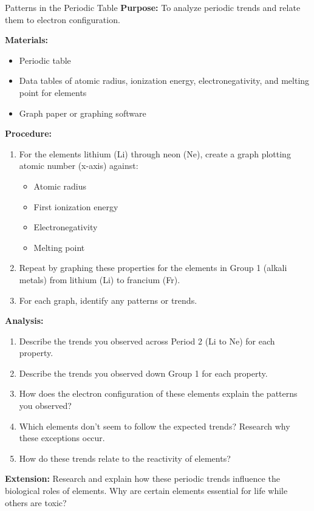 
\begin{investigation}{Patterns in the Periodic Table}
\textbf{Purpose:} To analyze periodic trends and relate them to electron configuration.

\textbf{Materials:}
\begin{itemize}
    \item Periodic table
    \item Data tables of atomic radius, ionization energy, electronegativity, and melting point for elements
    \item Graph paper or graphing software
\end{itemize}

\textbf{Procedure:}
\begin{enumerate}
    \item For the elements lithium (Li) through neon (Ne), create a graph plotting atomic number (x-axis) against:
    \begin{itemize}
        \item Atomic radius
        \item First ionization energy
        \item Electronegativity
        \item Melting point
    \end{itemize}
    
    \item Repeat by graphing these properties for the elements in Group 1 (alkali metals) from lithium (Li) to francium (Fr).
    
    \item For each graph, identify any patterns or trends.
\end{enumerate}

\textbf{Analysis:}
\begin{enumerate}
    \item Describe the trends you observed across Period 2 (Li to Ne) for each property.
    \item Describe the trends you observed down Group 1 for each property.
    \item How does the electron configuration of these elements explain the patterns you observed?
    \item Which elements don't seem to follow the expected trends? Research why these exceptions occur.
    \item How do these trends relate to the reactivity of elements?
\end{enumerate}

\textbf{Extension:} Research and explain how these periodic trends influence the biological roles of elements. Why are certain elements essential for life while others are toxic?
\end{investigation}

